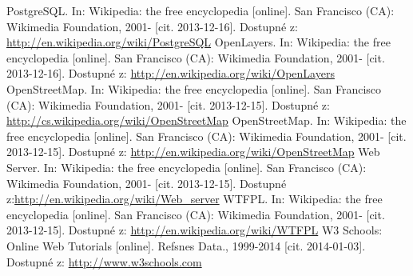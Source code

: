 \documentclass[11pt,a4paper,titlepage,oneside]{book}
\begin{document}
\begin{thebibliography}{99}
	PostgreSQL. In: Wikipedia: the free encyclopedia [online]. San Francisco (CA): Wikimedia Foundation, 2001- [cit. 2013-12-16]. Dostupné z: \url{http://en.wikipedia.org/wiki/PostgreSQL}
	OpenLayers. In: Wikipedia: the free encyclopedia [online]. San Francisco (CA): Wikimedia Foundation, 2001- [cit. 2013-12-16]. Dostupné z: \url{http://en.wikipedia.org/wiki/OpenLayers}
	OpenStreetMap. In: Wikipedia: the free encyclopedia [online]. San Francisco (CA): Wikimedia Foundation, 2001- [cit. 2013-12-15]. Dostupné z: \url{http://cs.wikipedia.org/wiki/OpenStreetMap}
	OpenStreetMap. In: Wikipedia: the free encyclopedia [online]. San Francisco (CA): Wikimedia Foundation, 2001- [cit. 2013-12-15]. Dostupné z: \url{http://en.wikipedia.org/wiki/OpenStreetMap}
	Web Server. In: Wikipedia: the free encyclopedia [online]. San Francisco (CA): Wikimedia Foundation, 2001- [cit. 2013-12-15]. Dostupné z:\url{http://en.wikipedia.org/wiki/Web_server}
	 WTFPL. In: Wikipedia: the free encyclopedia [online]. San Francisco (CA): Wikimedia Foundation, 2001- [cit. 2013-12-15]. Dostupné z: \url{http://en.wikipedia.org/wiki/WTFPL}
	W3 Schools: Online Web Tutorials [online]. Refsnes Data., 1999-2014 [cit. 2014-01-03]. Dostupné z: \url{http://www.w3schools.com}
\end{thebibliography}
\end{document}
